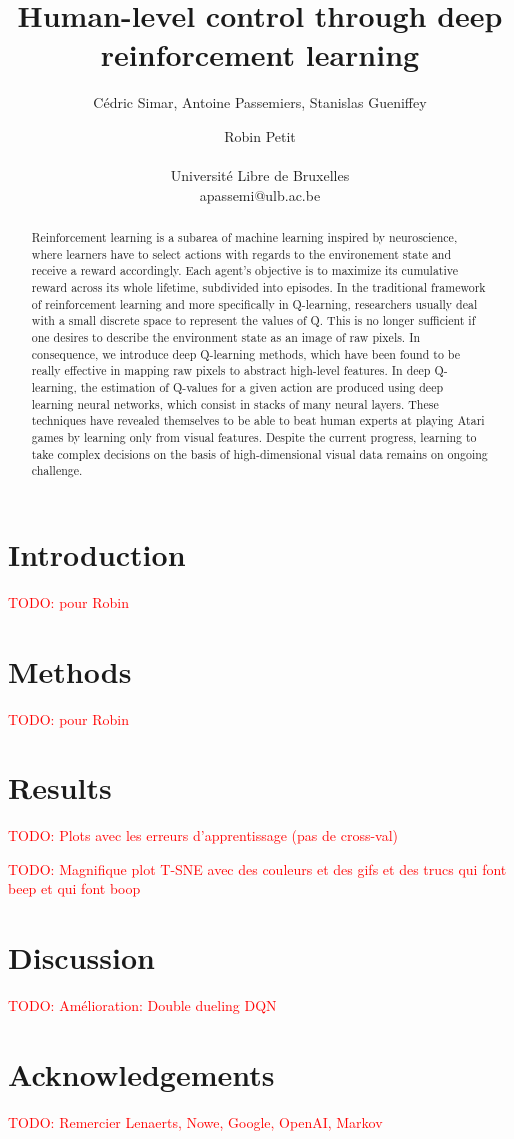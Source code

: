 \documentclass[letterpaper]{article}
\title{Human-level control through deep reinforcement learning}
\author{C\'{e}dric Simar, Antoine Passemiers, Stanislas Gueniffey \and Robin Petit \\
\mbox{}\\
Universit\'{e} Libre de Bruxelles \\
apassemi@ulb.ac.be}
\newcommand\todo[1]{\textcolor{red}{TODO: #1}}
\begin{document}
\maketitle

\begin{abstract}

  Reinforcement learning is a subarea of machine learning inspired by neuroscience, where learners have to select actions with
  regards to the environement state and receive a reward accordingly. Each agent's objective is to maximize its cumulative reward across its whole lifetime,
  subdivided into episodes. In the traditional framework of reinforcement learning and more specifically in Q-learning,
  researchers usually deal with a small discrete space to represent the values of Q. This is no longer sufficient if one desires to describe the environment state
  as an image of raw pixels. In consequence, we introduce deep Q-learning methods, which have been found to be really effective in mapping raw pixels
  to abstract high-level features. In deep Q-learning, the estimation of Q-values for a given action are produced using deep learning neural networks,
  which consist in stacks of many neural layers. These techniques have revealed themselves to be able to beat human experts at playing Atari games 
  by learning only from visual features. Despite the current progress, learning to take complex decisions on the basis of high-dimensional visual data remains on
  ongoing challenge.

\end{abstract}

\section{Introduction}

  \todo{pour Robin}

\section{Methods}

  \todo{pour Robin} \citep{Mnih2015}

\section{Results}

  \todo{Plots avec les erreurs d'apprentissage (pas de cross-val)}

  \todo{Magnifique plot T-SNE avec des couleurs et des gifs et des trucs qui font beep et qui font boop} \citep{wattenberg2016how}

\section{Discussion}

  \todo{Amélioration: Double dueling DQN} \citep{DBLP:journals/corr/WangFL15}

\section{Acknowledgements}

  \todo{Remercier Lenaerts, Nowe, Google, OpenAI, Markov}

\footnotesize


\end{document}
